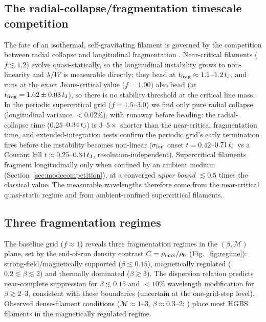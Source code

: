 \documentclass[usenatbib,twoside,twocolumn]{mnras}
\begin{document}
\subsection{The radial-collapse/fragmentation timescale competition}
\label{sec:regimes}

The fate of an isothermal, self-gravitating filament is governed by the competition between radial collapse and longitudinal fragmentation \citep{Inutsuka1997,Pon2012}. Near-critical filaments ($f\lesssim1.2$) evolve quasi-statically, so the longitudinal instability grows to non-linearity and $\lambda/W$ is measurable directly; they bead at $t_{\rm frag}\approx1.1$--$1.2\,t_{\rm J}$, and runs at the exact Jeans-critical value ($f=1.00$) also bead (at $t_{\rm frag}=1.62\pm0.03\,t_{\rm J}$), so there is no stability threshold at the critical line mass. In the periodic supercritical grid ($f=1.5$--$3.0$) we find only pure radial collapse (longitudinal variance $<0.02\%$), with runaway before beading: the radial-collapse time ($0.25$--$0.34\,t_{\rm J}$) is $3$--$5\times$ shorter than the near-critical fragmentation time, and extended-integration tests confirm the periodic grid's early termination fires before the instability becomes non-linear ($\sigma_{\rm lon}$ onset $t=0.42$--$0.71\,t_{\rm J}$ vs a Courant kill $t\approx0.25$--$0.34\,t_{\rm J}$, resolution-independent). Supercritical filaments fragment longitudinally only when confined by an ambient medium (Section~\ref{sec:modecompetition}), at a converged \emph{upper bound} $\lesssim0.5$ times the classical value. The measurable wavelengths therefore come from the near-critical quasi-static regime and from ambient-confined supercritical filaments.

\subsection{Three fragmentation regimes}

The baseline grid ($f\approx1$) reveals three fragmentation regimes in the $(\beta,\mathcal{M})$ plane, set by the end-of-run density contrast $C=\rho_{\rm max}/\rho_0$ (Fig.~\ref{fig:regime}): strong-field/magnetically supported ($\beta\lesssim0.15$), magnetically regulated ($0.2\lesssim\beta\lesssim2$) and thermally dominated ($\beta\gtrsim3$). The dispersion relation \citep{Nakamura1993} predicts near-complete suppression for $\beta\lesssim0.15$ and $<10\%$ wavelength modification for $\beta\gtrsim2$--$3$, consistent with these boundaries (uncertain at the one-grid-step level). Observed dense-filament conditions ($\mathcal{M}\approx1$--$3$, $\beta\approx0.3$--$2$; \citealt{Arzoumanian2019,Planck2016,Pattle2018}) place most HGBS filaments in the magnetically regulated regime.
\end{document}
